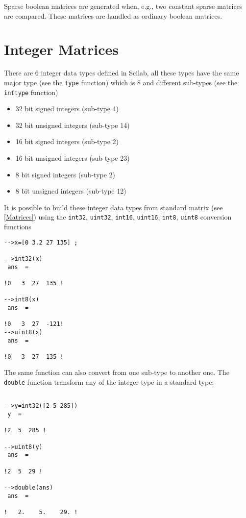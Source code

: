 Sparse boolean matrices are generated when, e.g., two constant sparse
matrices are compared. These matrices are handled as ordinary boolean
matrices.


\section{Integer Matrices}

There are 6 integer data types defined in Scilab, all these types have
the same major type (see the {\tt type} function) which is 8  and
different sub-types (see the {\tt inttype} function)
\begin{itemize}
\item 32 bit signed integers (sub-type 4)
\item 32 bit unsigned integers (sub-type 14)
\item 16 bit signed integers (sub-type 2)
\item 16 bit unsigned integers (sub-type 23)
\item 8 bit signed integers (sub-type 2)
\item 8 bit unsigned integers (sub-type 12)
\end{itemize}
It is possible to build these integer data types from standard matrix
(see \ref{Matrices}) using the {\tt int32}, {\tt uint32}, {\tt int16},
{\tt uint16}, {\tt int8}, {\tt uint8} 
conversion functions
\begin{verbatim}
-->x=[0 3.2 27 135] ;

-->int32(x)
 ans  =
 
!0   3  27  135 !

-->int8(x)
 ans  =
 
!0   3  27  -121!
-->uint8(x)
 ans  =
 
!0   3  27  135 !
\end{verbatim}

The same function can also convert from one sub-type to another
one. The {\tt double} function transform any of the integer type in a
standard type:

\begin{verbatim}

-->y=int32([2 5 285])
 y  =
 
!2  5  285 !

-->uint8(y)
 ans  =
 
!2  5  29 !

-->double(ans)
 ans  =
 
!   2.    5.    29. !
\end{verbatim}

